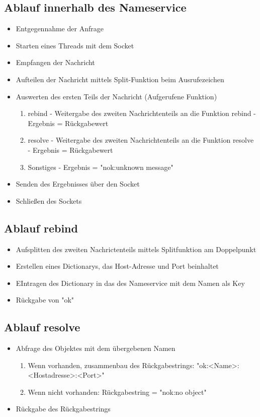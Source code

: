 \subsection{Ablauf innerhalb des Nameservice}
\begin{itemize}
\item Entgegennahme der Anfrage
\item Starten eines Threads mit dem Socket
\item Empfangen der Nachricht
\item Aufteilen der Nachricht mittels Split-Funktion beim Ausrufezeichen 
\item Auswerten des ersten Teils der Nachricht (Aufgerufene Funktion)
\begin{enumerate}
\item rebind - Weitergabe des zweiten Nachrichtenteils an die Funktion rebind - Ergebnis = Rückgabewert
\item resolve - Weitergabe des zweiten Nachrichtenteils an die Funktion resolve - Ergebnis = Rückgabewert
\item Sonstiges - Ergebnis = "nok:unknown message"
\end{enumerate}
\item Senden des Ergebnisses über den Socket
\item Schließen des Sockets
\end{itemize}

\subsection{Ablauf rebind}
\begin{itemize}
\item Aufsplitten des zweiten Nachrictenteils mittels Splitfunktion am Doppelpunkt
\item Erstellen eines Dictionarys, das Host-Adresse und Port beinhaltet
\item EIntragen des Dictionary in das des Nameservice mit dem Namen als Key
\item Rückgabe von "ok"
\end{itemize}

\subsection{Ablauf resolve}
\begin{itemize}
\item Abfrage des Objektes mit dem übergebenen Namen
\begin{enumerate}
\item Wenn vorhanden, zusammenbau des Rückgabestrings: "ok:<Name>:<Hostadresse>:<Port>"
\item Wenn nicht vorhanden: Rückgabestring = 	"nok:no object"
\end{enumerate}
\item Rückgabe des Rückgabestrings
\end{itemize}

